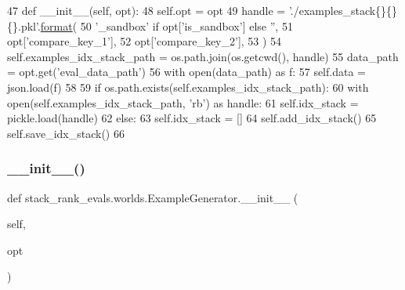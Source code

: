 \begin{DoxyCode}
47     \textcolor{keyword}{def }\_\_init\_\_(self, opt):
48         self.opt = opt
49         handle = \textcolor{stringliteral}{'./examples\_stack\{\}\{\}\{\}.pkl'}.\hyperlink{namespaceparlai_1_1chat__service_1_1services_1_1messenger_1_1shared__utils_a32e2e2022b824fbaf80c747160b52a76}{format}(
50             \textcolor{stringliteral}{'\_sandbox'} \textcolor{keywordflow}{if} opt[\textcolor{stringliteral}{'is\_sandbox'}] \textcolor{keywordflow}{else} \textcolor{stringliteral}{''},
51             opt[\textcolor{stringliteral}{'compare\_key\_1'}],
52             opt[\textcolor{stringliteral}{'compare\_key\_2'}],
53         )
54         self.examples\_idx\_stack\_path = os.path.join(os.getcwd(), handle)
55         data\_path = opt.get(\textcolor{stringliteral}{'eval\_data\_path'})
56         with open(data\_path) \textcolor{keyword}{as} f:
57             self.data = json.load(f)
58 
59         \textcolor{keywordflow}{if} os.path.exists(self.examples\_idx\_stack\_path):
60             with open(self.examples\_idx\_stack\_path, \textcolor{stringliteral}{'rb'}) \textcolor{keyword}{as} handle:
61                 self.idx\_stack = pickle.load(handle)
62         \textcolor{keywordflow}{else}:
63             self.idx\_stack = []
64             self.add\_idx\_stack()
65             self.save\_idx\_stack()
66 
\end{DoxyCode}
\mbox{\label{classstack__rank__evals_1_1worlds_1_1ExampleGenerator_a6b15b72b85a0358bb6c171ef6b183c9d}} 
\subsubsection{\texorpdfstring{\+\_\+\+\_\+init\+\_\+\+\_\+()}{\_\_init\_\_()}\hspace{0.1cm}{\footnotesize\ttfamily [2/2]}}
{\footnotesize\ttfamily def stack\+\_\+rank\+\_\+evals.\+worlds.\+Example\+Generator.\+\_\+\+\_\+init\+\_\+\+\_\+ (\begin{DoxyParamCaption}\item[{}]{self,  }\item[{}]{opt }\end{DoxyParamCaption})}



